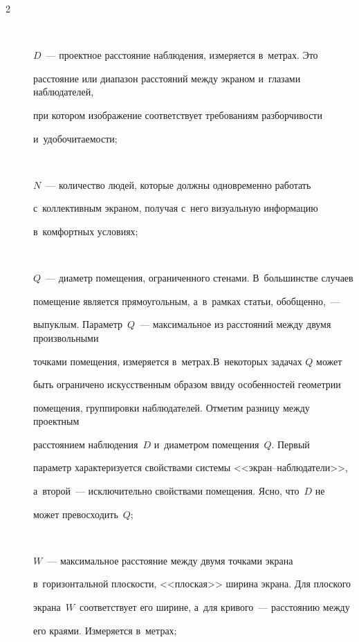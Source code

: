 \begin{multicols}{2}
\begin{description}

\item[\,]

$D$~--- проектное расстояние наблюдения, измеряется в~метрах. Это

расстояние или диапазон расстояний между экраном и~глазами наблюдателей,

при котором изображение соответствует требованиям разборчивости

и~удобочита\-емости;

\item[\,]

$N$~--- количество людей, которые должны одновременно работать

с~коллективным экраном, получая с~него визуальную информацию

в~комфортных условиях;

\item[\,]

$Q$~--- диаметр помещения, ограниченного сте\-нами. В~большинстве случаев

помещение является прямоугольным, а~в~рамках статьи, обобщенно,~---

выпуклым. Параметр~$Q$~--- максимальное из расстояний между двумя произвольными

точками помещения, измеряется в~метрах.\linebreak В~некоторых задачах $Q$ может

быть ограничено искусственным образом ввиду особенностей геометрии

помещения, группировки наблюдателей. Отметим разницу между проектным

расстояни\-ем наблюдения~$D$ и~диаметром помещения~$Q$. Первый

параметр характеризуется свойствами системы <<экран--на\-блю\-да\-те\-ли>>,

а~второй~--- исключительно свойствами помещения. Ясно, что~$D$ не

может превосходить~$Q$;

\item[\,]

$W$~--- максимальное расстояние между двумя точками экрана

в~горизонтальной плоскости, <<плоская>> ширина экрана. Для плоского

экрана~$W$~соответствует его ширине, а~для кривого~--- расстоянию между

его краями. Измеряется в~мет\-рах;


\end{description}
\end{multicols}

